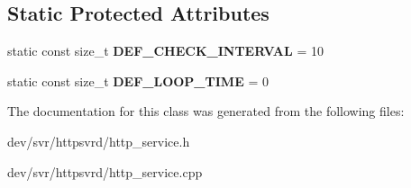 \subsection*{Static Protected Attributes}
\begin{DoxyCompactItemize}
\item 
\hypertarget{classHttpService_aec9ec5c4f2eb9a7ecba8207d47f2509d}{
static const size\_\-t {\bfseries DEF\_\-CHECK\_\-INTERVAL} = 10}
\label{classHttpService_aec9ec5c4f2eb9a7ecba8207d47f2509d}

\item 
\hypertarget{classHttpService_addfbf7a63fdb80db25b5287d8a8a8179}{
static const size\_\-t {\bfseries DEF\_\-LOOP\_\-TIME} = 0}
\label{classHttpService_addfbf7a63fdb80db25b5287d8a8a8179}

\end{DoxyCompactItemize}


The documentation for this class was generated from the following files:\begin{DoxyCompactItemize}
\item 
dev/svr/httpsvrd/http\_\-service.h\item 
dev/svr/httpsvrd/http\_\-service.cpp\end{DoxyCompactItemize}
